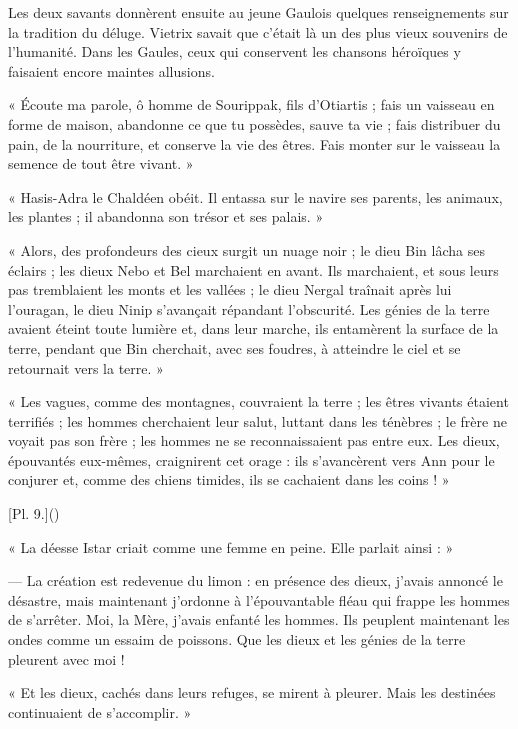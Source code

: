 \documentclass[a4paper, 11pt, oneside, polutonikogreek, french]{article}
\begin{document}
\bigskip
\centerline{\EightStarTaper}
\centerline{\EightStarTaper\EightStarTaper}
\bigskip

Les deux savants donnèrent ensuite au jeune Gaulois quelques renseignements sur la tradition du déluge. Vietrix savait que c'était là un des plus vieux souvenirs de l'humanité. Dans les Gaules, ceux qui conservent les chansons héroïques y faisaient encore maintes allusions.

« Écoute ma parole, ô homme de Sourippak, fils d'Otiartis ; fais un vaisseau en forme de maison, abandonne ce que tu possèdes, sauve ta vie ; fais distribuer du pain, de la nourriture, et conserve la vie des êtres. Fais monter sur le vaisseau la semence de tout être vivant. »

« Hasis-Adra le Chaldéen obéit. Il entassa sur le navire ses parents, les animaux, les plantes ; il abandonna son trésor et ses palais. »

« Alors, des profondeurs des cieux surgit un nuage noir ; le dieu Bin lâcha ses éclairs ; les dieux Nebo et Bel marchaient en avant. Ils marchaient, et sous leurs pas tremblaient les monts et les vallées ; le dieu Nergal traînait après lui l'ouragan, le dieu Ninip s'avançait répandant l'obscurité. Les génies de la terre avaient éteint toute lumière et, dans leur marche, ils entamèrent la surface de la terre, pendant que Bin cherchait, avec ses foudres, à atteindre le ciel et se retournait vers la terre. »

« Les vagues, comme des montagnes, couvraient la terre ; les êtres vivants étaient terrifiés ; les hommes cherchaient leur salut, luttant dans les ténèbres ; le frère ne voyait pas son frère ; les hommes ne se reconnaissaient pas entre eux. Les dieux, épouvantés eux-mêmes, craignirent cet orage : ils s'avancèrent vers Ann pour le conjurer et, comme des chiens timides, ils se cachaient dans les coins ! »

[Pl. 9.]()

« La déesse Istar criait comme une femme en peine. Elle parlait ainsi : »

--- La création est redevenue du limon : en présence des dieux, j'avais annoncé le désastre, mais maintenant j'ordonne à l'épouvantable fléau qui frappe les hommes de s'arrêter. Moi, la Mère, j'avais enfanté les hommes. Ils peuplent maintenant les ondes comme un essaim de poissons. Que les dieux et les génies de la terre pleurent avec moi !

« Et les dieux, cachés dans leurs refuges, se mirent à pleurer. Mais les destinées continuaient de s'accomplir. »
\end{document}
